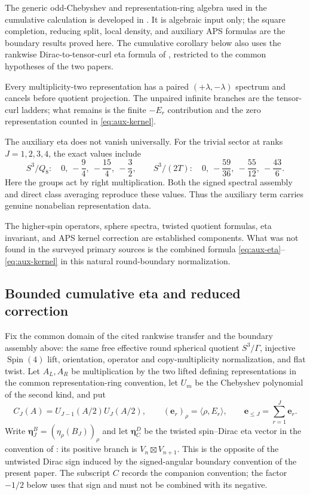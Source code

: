 \documentclass[11pt]{article}
\theoremstyle{definition}
\newcommand{\etaInv}{\eta}
\newcommand{\Spin}{\operatorname{Spin}}
\begin{document}
The generic odd-Chebyshev and representation-ring
algebra used in the cumulative calculation is developed in
\cite{Mahmood2026BivariateMcKay}.  It is algebraic input only; the square
completion, reducing split, local density, and auxiliary APS formulas are the
boundary results proved here.  The cumulative corollary below also uses the
rankwise Dirac-to-tensor-curl eta formula of
\cite{Mahmood2026DiracToTensorCurlEtaTransfer}, restricted to the common
hypotheses of the two papers.

Every multiplicity-two representation has a paired
$(+\lambda,-\lambda)$ spectrum and cancels before quotient projection.  The
unpaired infinite branches are the tensor-curl ladders; what remains is the
finite $-E_r$ contribution and the zero representation counted in
\eqref{eq:aux-kernel}.

The auxiliary eta does not vanish universally.  For the trivial sector at
ranks $J=1,2,3,4$, the exact values include
\[
 S^3/Q_8:\quad 0,\ -\frac94,\ -\frac{15}{4},\ -\frac32,
 \qquad
 S^3/(2T):\quad 0,\ -\frac{59}{36},\ -\frac{55}{12},\ -\frac{43}{6}.
\]
Here the groups act by right multiplication.  Both the signed spectral
assembly and direct class averaging reproduce these values.  Thus the
auxiliary term carries genuine nonabelian representation data.

The higher-spin operators, sphere spectra, twisted quotient formulas, eta
invariant, and APS kernel correction are established components.  What was
not found in the surveyed primary sources is the combined formula
\eqref{eq:aux-eta}--\eqref{eq:aux-kernel} in this natural round-boundary
normalization.

\subsection{Bounded cumulative eta and reduced correction}

Fix the common domain of the cited rankwise transfer and the boundary
assembly above: the same free effective round spherical quotient $S^3/\Gamma$,
injective $\Spin(4)$ lift, orientation, operator and copy-multiplicity
normalization, and flat twist.  Let $A_L,A_R$ be multiplication by the two
lifted defining representations in the common representation-ring
convention, let $U_m$ be the Chebyshev polynomial of the second kind, and put
\[
 C_J(A)=U_{J-1}(A/2)U_J(A/2),\qquad
(\boldsymbol e_r)_\rho=\langle\rho,E_r\rangle,\qquad
 \boldsymbol e_{\leq J}=\sum_{r=1}^{J}\boldsymbol e_r.
\]
Write $\boldsymbol\eta^B_J=(\etaInv_\rho(B_J))_\rho$ and let
$\boldsymbol\eta^D_C$ be the twisted spin--Dirac eta vector in the convention
of \cite{Mahmood2026DiracToTensorCurlEtaTransfer}: its positive branch is
$V_n\boxtimes V_{n+1}$.  This is the opposite of the untwisted Dirac sign
induced by the signed-angular boundary convention of the present paper.
The subscript $C$ records the companion convention; the factor $-1/2$ below
uses that sign and must not be combined with its negative.
\end{document}
